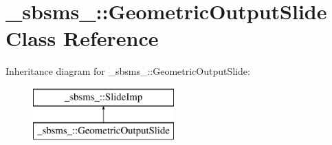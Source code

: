 \hypertarget{class__sbsms___1_1_geometric_output_slide}{}\section{\+\_\+sbsms\+\_\+\+:\+:Geometric\+Output\+Slide Class Reference}
\label{class__sbsms___1_1_geometric_output_slide}
Inheritance diagram for \+\_\+sbsms\+\_\+\+:\+:Geometric\+Output\+Slide\+:\begin{figure}[H]
\begin{center}
\leavevmode
\includegraphics[height=2.000000cm]{class__sbsms___1_1_geometric_output_slide}
\end{center}
\end{figure}
